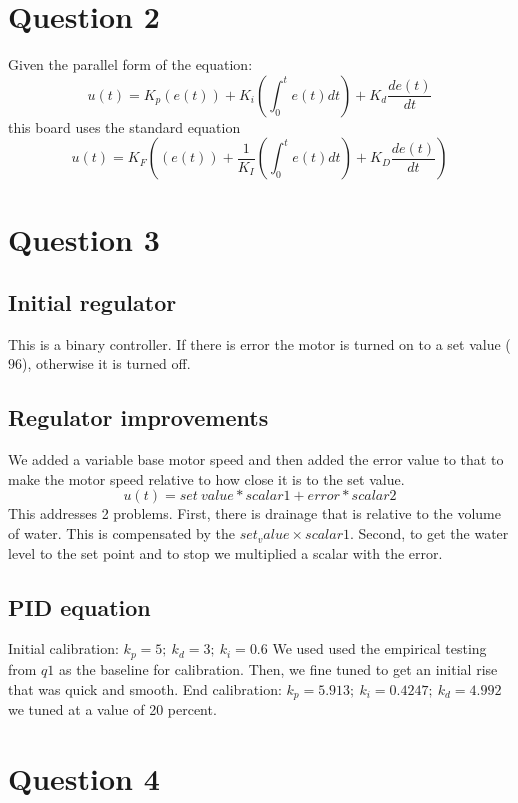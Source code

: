 \documentclass{article}
\begin{document}
\section{Question 2}
Given the parallel form of the equation:
\begin{equation} u(t) = K_p(e(t)) + K_i(\int_0^t e(t)dt) + K_d\frac{de(t)}{dt} \end{equation}
this board uses the standard equation
\begin{equation} u(t) = K_F((e(t)) + \frac{1}{K_I}(\int_0^t e(t)dt) + K_D\frac{de(t)}{dt}) \end{equation}

\section{Question 3}
\subsection{Initial regulator}
This is a binary controller. If there is error the motor is turned on to a set value ($96$), otherwise it is turned off.
\subsection{Regulator improvements}
We added a variable base motor speed and then added the error value to that to make the motor speed relative to how close it is to the set value.
\begin{equation} u(t) = set\ value*scalar1 + error*scalar2 \end{equation}
This addresses 2 problems. First, there is drainage that is relative to the volume of water. This is compensated by the $set_value \times scalar1$. Second, to get the water level to the set point and to stop we multiplied a scalar with the error.
\subsection{PID equation}
Initial calibration: $k_p = 5;\ k_d = 3;\ k_i = 0.6$ 
We used used the empirical testing from $q1$ as the baseline for calibration. Then, we fine tuned to get an initial rise that was quick and smooth.
End calibration: $k_p=5.913;\ k_i=0.4247;\ k_d=4.992$
we tuned at a value of 20 percent.

\section{Question 4}
\end{document}

